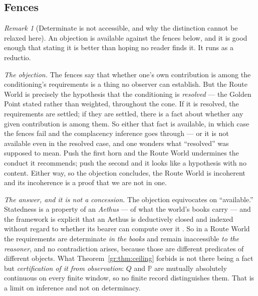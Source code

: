 \documentclass[11pt]{article}
\numberwithin{equation}{section}
\theoremstyle{plain}
\theoremstyle{definition}
\theoremstyle{remark}
\newtheorem{remark}[theorem]{Remark}
\newcommand{\PP}{\mathbb{P}}
\begin{document}
\subsection{Fences}\label{gc:sub:routefences}

\begin{remark}[Determinate is not accessible, and why the distinction
cannot be relaxed here]\label{gc:rem:determinacygap}
An objection is available against the fences below, and it is good enough
that stating it is better than hoping no reader finds it. It runs as a
reductio.

\emph{The objection.} The fences say that whether one's own contribution
is among the conditioning's requirements is a thing no observer can
establish. But the Route World is precisely the hypothesis that the
conditioning is \emph{resolved} --- the Golden Point stated rather than
weighted, throughout the cone. If it is resolved, the requirements are
settled; if they are settled, there is a fact about whether any given
contribution is among them. So either that fact is available, in which
case the fences fail and the complacency inference goes through --- or it
is not available even in the resolved case, and one wonders what
``resolved'' was supposed to mean. Push the first horn and the Route
World undermines the conduct it recommends; push the second and it looks
like a hypothesis with no content. Either way, so the objection
concludes, the Route World is incoherent and its incoherence is a proof
that we are not in one.

\emph{The answer, and it is not a concession.} The objection equivocates
on ``available.'' Statedness is a property of an \emph{Aethus} --- of
what the world's books carry --- and the framework is explicit that an
Aethus is deductively closed and indexed without regard to whether its
bearer can compute over it \cite{Aethus}. So in a Route World the
requirements are determinate \emph{in the books} and remain inaccessible
\emph{to the reasoner}, and no contradiction arises, because those are
different predicates of different objects. What
Theorem~\ref{gr:thm:ceiling} forbids is not there being a fact but
\emph{certification of it from observation}: $Q$ and $\PP$ are mutually
absolutely continuous on every finite window, so no finite record
distinguishes them. That is a limit on inference and not on determinacy.


\end{remark}
\end{document}
